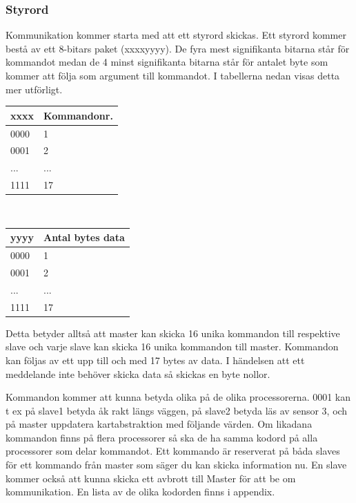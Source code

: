 \documentclass[a4paper,12pt,fleqn]{article}
\begin{document}
\subsubsection{Styrord}
Kommunikation kommer starta med att ett styrord skickas. Ett styrord kommer bestå av ett 8-bitars paket (xxxxyyyy). De fyra mest signifikanta bitarna står för kommandot medan de 4 minst signifikanta bitarna står för antalet byte som kommer att följa som argument till kommandot. I tabellerna nedan visas detta mer utförligt. \\

 \begin{tabular}{| p{3cm} | p{3.5cm} |}
	    \hline
		\textbf{xxxx} & \textbf{Kommandonr.} \\ \hline
		0000 & 1 \\ \hline
		0001 & 2 \\ \hline
		... & ... \\ \hline
		1111 & 17 \\ \hline
	    \end{tabular}
		\\

 \begin{tabular}{| p{3cm} | p{3.5cm} |}
	    \hline
		\textbf{yyyy} & \textbf{Antal bytes data} \\ \hline
		0000 & 1 \\ \hline
		0001 & 2 \\ \hline
		... & ... \\ \hline
		1111 & 17 \\ \hline
	    \end{tabular}
		\vspace{0.5cm}
		
		Detta betyder alltså att master kan skicka 16 unika kommandon till respektive slave och varje slave kan skicka 16 unika kommandon till master. Kommandon kan följas av ett upp till och med 17 bytes av data. I händelsen att ett meddelande inte behöver skicka data så skickas en byte nollor.


		Kommandon kommer att kunna betyda olika på de olika processorerna. 0001 kan t ex på slave1 betyda åk rakt längs väggen, på slave2 betyda läs av sensor 3, och på master uppdatera kartabstraktion med följande värden. Om likadana kommandon finns på flera processorer så ska de ha samma kodord på alla processorer som delar kommandot. Ett kommando är reserverat på båda slaves för ett kommando från master som säger du kan skicka information nu. En slave kommer också att kunna skicka ett avbrott till Master för att be om kommunikation. En lista av de olika kodorden finns i appendix. 
		
\end{document}
